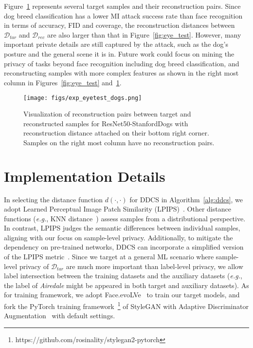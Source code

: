 Figure~\ref{fig:eye_test_dogs} represents several target samples and their reconstruction pairs.
Since dog breed classification has a lower MI attack success rate than face recognition in terms of accuracy, FID and coverage, the reconstruction distances between $\mathcal{D}_{tar}$ and $\mathcal{D}_{rec}$ are also larger than that in Figure~\ref{fig:eye_test}.
However, many important private details are still captured by the attack, such as the dog's posture and the general scene it is in.
Future work could focus on mining the privacy of tasks beyond face recognition including dog breed classification, and reconstructing samples with more complex features as shown in the right most column in Figures~\ref{fig:eye_test} and~\ref{fig:eye_test_dogs}.

\begin{figure}[htbp]%
	\centering
	\texttt{[image: figs/exp\_eyetest\_dogs.png]}
	\caption{Visualization of reconstruction pairs between target and reconstructed samples for ResNet50-StanfordDogs with reconstruction distance attached on their bottom right corner. Samples on the right most column have no reconstruction pairs.}
	\label{fig:eye_test_dogs}
\end{figure}

\section{Implementation Details}
In selecting the distance function $d(\cdot,\cdot)$ for DDCS in Algorithm~\ref{alg:ddcs}, we adopt Learned Perceptual Image Patch Similarity (LPIPS)~\cite{lpips18}. Other distance functions (\emph{e.g.}, KNN distance~\cite{kedmi21iccv}) assess samples from a distributional perspective. In contrast, LPIPS judges the semantic differences between individual samples, aligning with our focus on sample-level privacy.
Additionally, to mitigate the dependency on pre-trained networks, DDCS can incorporate a simplified version of the LPIPS metric~\cite{lpips21}.
Since we target at a general ML scenario where sample-level privacy of $\mathcal{D}_{tar}$ are much more important than label-level privacy, we allow label intersection between the training datasets and the auxiliary datasets (\emph{e.g.}, the label of \textit{Airedale} might be appeared in both target and auxiliary datasets). As for training framework, we adopt Face.evoLVe~\cite{faceevolve21} to train our target models, and fork the PyTorch training framework~\footnote{https://github.com/rosinality/stylegan2-pytorch} of StyleGAN with Adaptive Discriminator Augmentation~\cite{stylegan2ada_20nips} with default settings.

